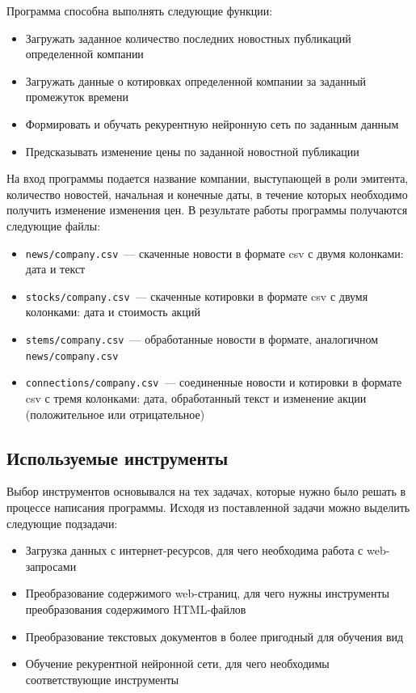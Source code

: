\documentclass[14pt]{matmex-diploma-custom}
\begin{document}
Программа способна выполнять следующие функции:

\begin{itemize}
\item Загружать заданное количество последних новостных публикаций определенной компании
\item Загружать данные о котировках определенной компании за заданный промежуток времени
\item Формировать и обучать рекурентную нейронную сеть по заданным данным
\item Предсказывать изменение цены по заданной новостной публикации
\end{itemize}

На вход программы подается название компании, выступающей в роли эмитента, количество новостей, начальная и конечные даты, в течение которых необходимо получить изменение изменения цен. В результате работы программы получаются следующие файлы:

\begin{itemize}
\item \texttt{news/company.csv}~--- скаченные новости в формате csv с двумя колонками: дата и текст
\item \texttt{stocks/company.csv}~--- скаченные котировки в формате csv с двумя колонками: дата и стоимость акций
\item \texttt{stems/company.csv}~--- обработанные новости в формате, аналогичном \texttt{news/company.csv}
\item \texttt{connections/company.csv}~--- соединенные новости и котировки в формате csv с тремя колонками: дата, обработанный текст и изменение акции (положительное или отрицательное)
\end{itemize}

\subsection{Используемые инструменты}

Выбор инструментов основывался на тех задачах, которые нужно было решать в процессе написания программы. Исходя из поставленной задачи можно выделить следующие подзадачи:

\begin{itemize}
\item Загрузка данных с интернет-ресурсов, для чего необходима работа с web-запросами
\item Преобразование содержимого web-страниц, для чего нужны инструменты преобразования содержимого HTML-файлов
\item Преобразование текстовых документов в более пригодный для обучения вид
\item Обучение рекурентной нейронной сети, для чего необходимы соответствующие инструменты
\end{itemize}
\end{document}
